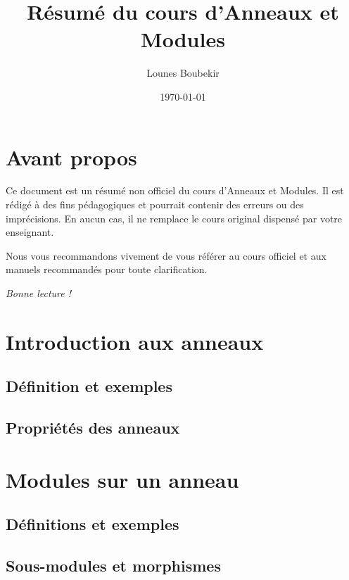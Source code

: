 \documentclass[12pt]{book}
\title{Résumé du cours d'Anneaux et Modules}
\author{Lounes Boubekir}
\date{\today}
\begin{document}
\maketitle

\chapter*{Avant propos}

Ce document est un résumé non officiel du cours d'Anneaux et Modules. Il est rédigé à des fins pédagogiques et pourrait contenir des erreurs ou des imprécisions. En aucun cas, il ne remplace le cours original dispensé par votre enseignant.

Nous vous recommandons vivement de vous référer au cours officiel et aux manuels recommandés pour toute clarification.

\vfill
\textit{Bonne lecture !}

\newpage

\tableofcontents
\newpage

\chapter{Introduction aux anneaux}
\section{Définition et exemples}
\lipsum[1-2] %
\section{Propriétés des anneaux}
\lipsum[3-4] %

\chapter{Modules sur un anneau}
\section{Définitions et exemples}
\lipsum[5-6] %
\section{Sous-modules et morphismes}
\lipsum[7-8] %

\end{document}
